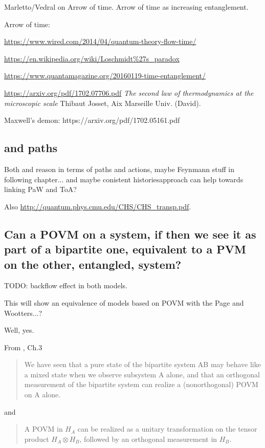 Marletto/Vedral on Arrow of time. Arrow of time as increasing entanglement.

Arrow of time: 

\url{https://www.wired.com/2014/04/quantum-theory-flow-time/}

\url{https://en.wikipedia.org/wiki/Loschmidt%27s_paradox}

\url{https://www.quantamagazine.org/20160119-time-entanglement/}

\url{https://arxiv.org/pdf/1702.07706.pdf} \textit{The second law of thermodynamics at the microscopic scale}
Thibaut Josset,
Aix Marseille Univ. (David).

Maxwell's demon: https://arxiv.org/pdf/1702.05161.pdf

\subsection{and paths}

Both \cite{YearsleyHalliwell_Clocks} and \cite{Gambini_PW}
reason in terms of paths and actions, maybe Feynmann stuff
in following chapter... and maybe conistent historiesapproach can help
towards linking PaW and ToA?

Also \url{http://quantum.phys.cmu.edu/CHS/CHS_transp.pdf}.

\subsection{Can a POVM on a system, if then we see it as part of a bipartite one,
equivalent to a PVM on the other, entangled, system?}

TODO: backflow effect in both models.

This will show an equivalence of models based on POVM with the Page and Wootters...?

Well, yes.

From \cite{PreskillNotes}, Ch.3 
\begin{quotation}
We have seen that
a pure state of the bipartite system AB may behave like a mixed state
when we observe subsystem A alone, and that an orthogonal measurement
of the bipartite system can realize a (nonorthogonal) POVM on A alone.
\end{quotation}

and

\begin{quotation}
A POVM in $H_A$ can be realized as a unitary transformation on the tensor
product $H_A \otimes H_B$, followed by an orthogonal measurement in $H_B$.
\end{quotation}

